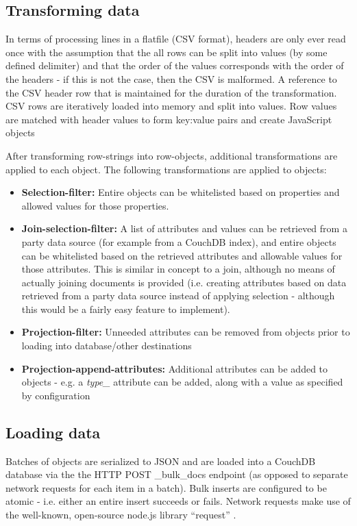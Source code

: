 \subsection{Transforming data}
In terms of processing lines in a flatfile (CSV format), headers are only ever read once with the assumption that the all rows can be split into values (by some defined delimiter) and that the order of the values corresponds with the order of the headers - if this is not the case, then the CSV is malformed. A reference to the CSV header row that is maintained for the duration of the transformation. CSV rows are iteratively loaded into memory and split into values. Row values are matched with header values to form key:value pairs and create JavaScript objects

After transforming row-strings into row-objects, additional transformations are applied to each object. The following transformations are applied to objects:

\begin{itemize}
    \item \textbf{Selection-filter:} Entire objects can be whitelisted based on properties and allowed values for those properties.
    \item \textbf{Join-selection-filter:} A list of attributes and values can be retrieved from a  party data source (for example from a CouchDB index), and entire objects can be whitelisted based on the retrieved attributes and allowable values for those attributes. This is similar in concept to a join, although no means of actually joining documents is provided (i.e. creating attributes based on data retrieved from a  party data source instead of applying selection - although this would be a fairly easy feature to implement).
    \item \textbf{Projection-filter:} Unneeded attributes can be removed from objects prior to loading into database/other destinations
    \item \textbf{Projection-append-attributes:} Additional attributes can be added to objects - e.g. a \textit{type\_} attribute can be added, along with a value as specified by configuration
\end{itemize}

\subsection{Loading data}
Batches of objects are serialized to JSON and are loaded into a CouchDB database via the the HTTP POST \_bulk\_docs endpoint (as opposed to separate network requests for each item in a batch). Bulk inserts are configured to be atomic - i.e. either an entire insert succeeds or fails. Network requests make use of the well-known, open-source node.js library ``request'' \cite{request-lib}.